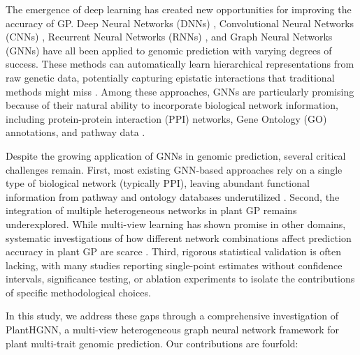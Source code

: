 \documentclass[11pt,a4paper]{article}
\begin{document}
The emergence of deep learning has created new opportunities for improving the accuracy of GP. Deep Neural Networks (DNNs) \citep{zhang2018deep}, Convolutional Neural Networks (CNNs) \citep{ma2021cropformer}, Recurrent Neural Networks (RNNs) \citep{wang2023deep}, and Graph Neural Networks (GNNs) \citep{wang2021netgp} have all been applied to genomic prediction with varying degrees of success. These methods can automatically learn hierarchical representations from raw genetic data, potentially capturing epistatic interactions that traditional methods might miss \citep{montesinos2021application}. Among these approaches, GNNs are particularly promising because of their natural ability to incorporate biological network information, including protein-protein interaction (PPI) networks, Gene Ontology (GO) annotations, and pathway data \citep{qiu2023netgp,zhao2025netgp}.

Despite the growing application of GNNs in genomic prediction, several critical challenges remain. First, most existing GNN-based approaches rely on a single type of biological network (typically PPI), leaving abundant functional information from pathway and ontology databases underutilized \citep{wang2021netgp,qiu2023netgp}. Second, the integration of multiple heterogeneous networks in plant GP remains underexplored. While multi-view learning has shown promise in other domains, systematic investigations of how different network combinations affect prediction accuracy in plant GP are scarce \citep{hu2025hgnn}. Third, rigorous statistical validation is often lacking, with many studies reporting single-point estimates without confidence intervals, significance testing, or ablation experiments to isolate the contributions of specific methodological choices.

In this study, we address these gaps through a comprehensive investigation of PlantHGNN, a multi-view heterogeneous graph neural network framework for plant multi-trait genomic prediction. Our contributions are fourfold:
\end{document}
